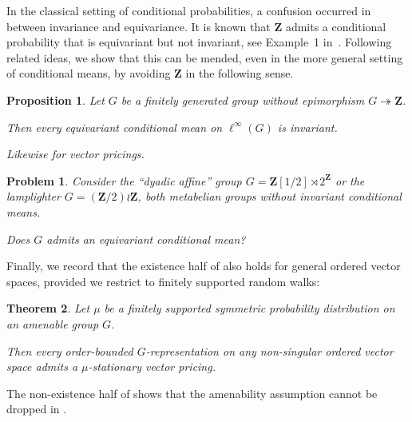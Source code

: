 \documentclass[11pt]{amsart}
\numberwithin{equation}{section}
\newtheorem{ithm}{Theorem}
\newtheorem{iprop}[ithm]{Proposition}
\newtheorem*{iprob*}{Problem}
\theoremstyle{definition}
\theoremstyle{definition}
\newcommand*{\ZZ}{\mathbf{Z}}
\begin{document}
\medskip
In the classical setting of conditional probabilities, a confusion occurred in~\cite[Proposition~1.3]{Armstrong89} between invariance and equivariance. It is known that $\ZZ$ admits a conditional probability that is equivariant but not invariant, see Example~1 in~\cite{Pruss2013}. Following related ideas, we show that this can be mended, even in the more general setting of conditional means, by avoiding $\ZZ$ in the following sense.

\begin{iprop}\label{iprop:indicable}
Let $G$ be a finitely generated group without epimorphism $G\twoheadrightarrow\ZZ$.

Then every equivariant conditional mean on $\ell^\infty(G)$ is invariant. 

Likewise for vector pricings.
\end{iprop}

\begin{iprob*}
Consider the ``dyadic affine'' group $G=\ZZ[1/2] \rtimes 2^\ZZ$ or the lamplighter $G=(\ZZ/2) \wr \ZZ$, both metabelian groups without invariant conditional means.

Does $G$ admits an equivariant conditional mean?
\end{iprob*}

Finally, we record that the existence half of  also holds for general ordered vector spaces, provided we restrict to finitely supported random walks:

\begin{ithm}\label{ithm:stat-abstract}
Let $\mu$ be a finitely supported symmetric probability distribution on an amenable group $G$.

Then every order-bounded $G$-representation on any non-singular ordered vector space admits a $\mu$-stationary vector pricing.
\end{ithm}

The non-existence half of  shows that the amenability assumption cannot be dropped in .
\end{document}
